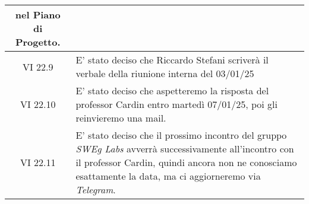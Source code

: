 \begin{table}[htbp]
\begin{tabular}{|c|p{}|}
        nel Piano di Progetto.\\
        \hline
        VI 22.9 & E' stato deciso che Riccardo Stefani scriverà il verbale della riunione interna del 03/01/25\\
        \hline
        VI 22.10 & E' stato deciso che aspetteremo la risposta del professor Cardin entro martedì 07/01/25, poi gli reinvieremo
        una mail.\\
        \hline
        VI 22.11 & E' stato deciso che il prossimo incontro del gruppo \emph{SWEg Labs} avverrà successivamente all'incontro con il professor Cardin, 
        quindi ancora non ne conosciamo esattamente la data, ma ci aggiorneremo via \emph{Telegram}.\\
        \hline
    \end{tabular}
\end{table}
